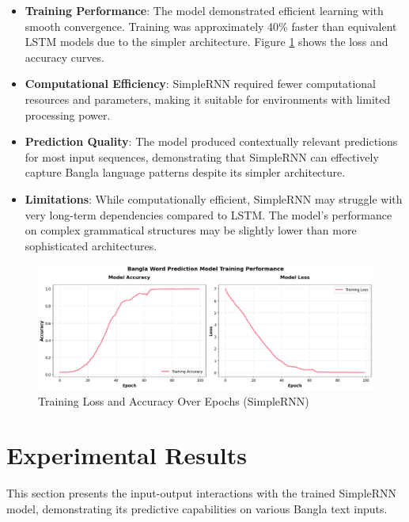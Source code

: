 \documentclass[12pt]{article}
\begin{document}
\begin{itemize}
    \item \textbf{Training Performance}: The model demonstrated efficient learning with smooth convergence. Training was approximately 40\% faster than equivalent LSTM models due to the simpler architecture. Figure \ref{fig:training_plots} shows the loss and accuracy curves.
    \item \textbf{Computational Efficiency}: SimpleRNN required fewer computational resources and parameters, making it suitable for environments with limited processing power.
    \item \textbf{Prediction Quality}: The model produced contextually relevant predictions for most input sequences, demonstrating that SimpleRNN can effectively capture Bangla language patterns despite its simpler architecture.
    \item \textbf{Limitations}: While computationally efficient, SimpleRNN may struggle with very long-term dependencies compared to LSTM. The model's performance on complex grammatical structures may be slightly lower than more sophisticated architectures.
\end{itemize}

\begin{figure}[H]
    \centering
    \label{fig:training_plots}
    \includegraphics[width=1.0\textwidth]{curves.png}
    \caption{Training Loss and Accuracy Over Epochs (SimpleRNN)}
\end{figure}

\section*{Experimental Results}
This section presents the input-output interactions with the trained SimpleRNN model, demonstrating its predictive capabilities on various Bangla text inputs.
\end{document}
